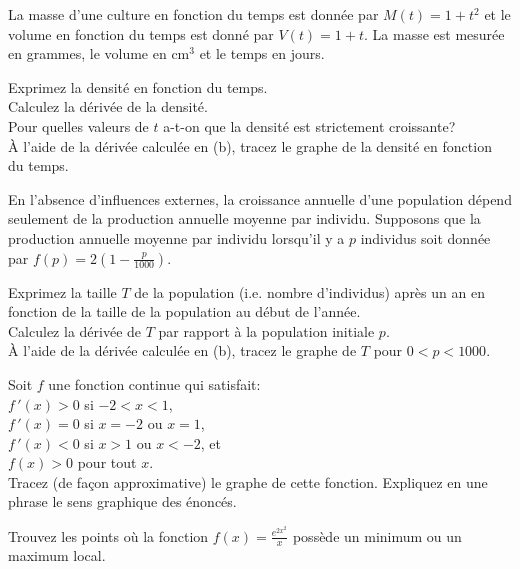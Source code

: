 \begin{question}[\life]
La masse d'une culture en fonction du temps est donnée par
$M(t) = 1 + t^2$ et le volume en fonction du temps est donné par
$V(t) = 1+t$.  La masse est mesurée en grammes, le volume en cm$^3$ et le
temps en jours.

 Exprimez la densité en fonction du temps.\\
 Calculez la dérivée de la densité.\\
 Pour quelles valeurs de $t$ a-t-on que la densité est
strictement croissante?\\
 À l'aide de la dérivée calculée en (b), tracez le graphe de
la densité en fonction du temps.
\label{6Q13}
\end{question}

\begin{question}[\life]
En l'absence d'influences externes, la croissance annuelle d'une
population dépend seulement de la production annuelle moyenne par
individu.  Supposons que la production annuelle moyenne par individu
lorsqu'il y a $p$ individus soit donnée par
$\displaystyle f(p) = 2\left( 1- \frac{p}{1000}\right)$.

 Exprimez la taille $T$ de la population (i.e. nombre d'individus)
après un an en fonction de la taille de la population au début de l'année.\\
 Calculez la dérivée de $T$ par rapport à la population
initiale $p$.\\
 À l'aide de la dérivée calculée en (b), tracez le graphe de
$T$ pour $0 < p < 1000$.
\label{6Q14}
\end{question}

\begin{question}
Soit $f$ une fonction continue qui satisfait:\\
 $f\,'(x)>0$ si $-2<x<1$,\\
 $f\,'(x)=0$ si $x=-2$ ou $x=1$,\\
 $f\,'(x)<0$ si $x>1$ ou $x<-2$, et\\
 $f(x)>0$ pour tout $x$.\\
Tracez (de façon approximative) le graphe de cette fonction.
Expliquez en une phrase le sens graphique des énoncés.
\label{6Q15}
\end{question}

\begin{question}
Trouvez les points où la fonction
$\displaystyle f(x)=\frac{e^{2x^2}}{x}$ possède un 
minimum ou un maximum local.
\label{6Q16}
\end{question}

